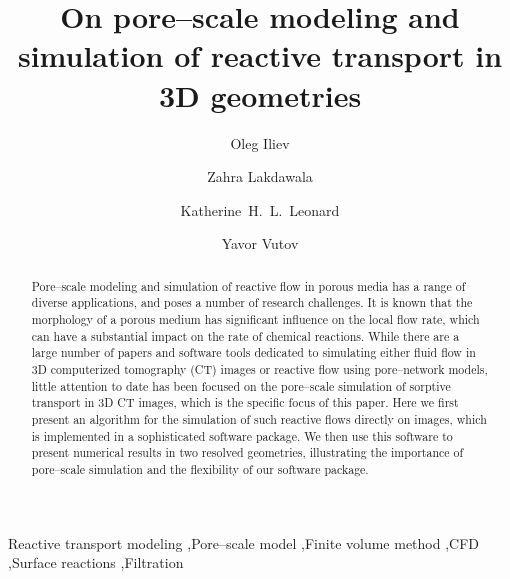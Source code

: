 \documentclass[preprint, 1p, authoryear]{elsarticle}
\title{On pore--scale modeling and simulation of reactive transport in 3D geometries}
\begin{document}
\begin{frontmatter}

\author[Fraunhofer,Saudi]{Oleg Iliev}

\author[Fraunhofer,DHI]{Zahra Lakdawala}

\author[Fraunhofer]{Katherine~H.~L.~Leonard}


\author[Bulgaria]{Yavor Vutov}

\address[Fraunhofer]{Fraunhofer Institute for Industrial Mathematics ITWM, Germany.}
\address[Saudi]{Numerical Porous Media SRI Center, King Abdullah University of Science and Technology, Kingdom of Saudi Arabia.}
\address[DHI]{DHI-WASY GmbH, Berlin, Germany.}
\address[Bulgaria]{Institute of Information and Communication Technologies, Department of Scientific Computations, Bulgarian Academy of Sciences, Sofia, Bulgaria.}




\begin{abstract}
Pore--scale modeling and simulation of reactive flow in porous media  has a range of diverse applications, and  poses a number of research challenges. 
It is known that the morphology of a  porous medium has significant influence on the local flow rate, which can have a substantial impact on the rate of chemical reactions. While  there are a large number of papers and software tools dedicated  to simulating   either fluid flow in 3D computerized tomography (CT)  images or reactive flow using pore--network models, little attention to date has been focused on the pore--scale simulation of sorptive transport in 3D CT images, which is the specific focus of this paper. 
Here we first present an algorithm for the simulation of such reactive flows directly on images, which is implemented in a sophisticated software package.  We then use this software to present numerical results in two  resolved geometries, illustrating the importance of pore--scale simulation and the flexibility of our software package. 
\end{abstract}

\begin{keyword}
Reactive transport modeling \sep Pore--scale model \sep Finite volume method \sep CFD \sep Surface reactions \sep Filtration
\end{keyword}
\end{frontmatter}
\end{document}
